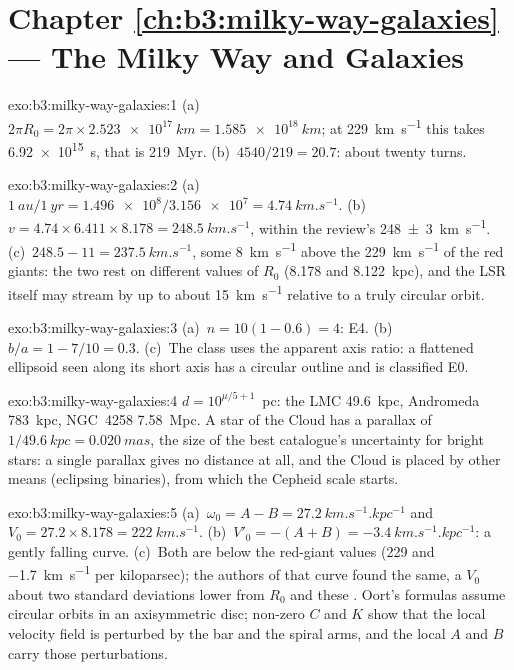 \section*{Chapter \ref{ch:b3:milky-way-galaxies} --- The Milky Way and Galaxies}

\begin{solution}{exo:b3:milky-way-galaxies:1}
(a)~$2\pi R_0 = 2\pi\times\qty{2.523e17}{km} = \qty{1.585e18}{km}$; at
\qty{229}{km.s^{-1}} this takes \qty{6.92e15}{s}, that is
\qty{219}{Myr}. (b)~$4540/219 = 20.7$: about twenty turns.
\end{solution}

\begin{solution}{exo:b3:milky-way-galaxies:2}
(a)~$\qty{1}{au}/\qty{1}{yr} = \num{1.496e8}/\num{3.156e7} =
\qty{4.74}{km.s^{-1}}$. (b)~$v = 4.74\times6.411\times8.178 =
\qty{248.5}{km.s^{-1}}$, within the review's
\qty[separate-uncertainty=true]{248 \pm 3}{km.s^{-1}}. (c)~$248.5 - 11 = \qty{237.5}{km.s^{-1}}$,
some \qty{8}{km.s^{-1}} above the \qty{229}{km.s^{-1}} of the red giants:
the two rest on different values of $R_0$ (8.178 and \qty{8.122}{kpc}),
and the LSR itself may stream by up to about \qty{15}{km.s^{-1}} relative
to a truly circular orbit.
\end{solution}

\begin{solution}{exo:b3:milky-way-galaxies:3}
(a)~$n = 10(1 - 0.6) = 4$: E4. (b)~$b/a = 1 - 7/10 = 0.3$. (c)~The class
uses the apparent axis ratio: a flattened ellipsoid seen along its short
axis has a circular outline and is classified E0.
\end{solution}

\begin{solution}{exo:b3:milky-way-galaxies:4}
$d = 10^{\mu/5 + 1}$~pc: the LMC \qty{49.6}{kpc}, Andromeda
\qty{783}{kpc}, NGC~4258 \qty{7.58}{Mpc}. A star of the Cloud has a
parallax of $1/\qty{49.6}{kpc} = \qty{0.020}{mas}$, the size of the best
catalogue's uncertainty for bright stars: a single parallax gives no
distance at all, and the Cloud is placed by other means (eclipsing
binaries), from which the Cepheid scale starts.
\end{solution}

\begin{solution}{exo:b3:milky-way-galaxies:5}
(a)~$\omega_0 = A - B = \qty{27.2}{km.s^{-1}.kpc^{-1}}$ and $V_0 =
27.2\times8.178 = \qty{222}{km.s^{-1}}$. (b)~$V'_0 = -(A + B) =
\qty{-3.4}{km.s^{-1}.kpc^{-1}}$: a gently falling curve. (c)~Both are
below the red-giant values (229 and \qty{-1.7}{km.s^{-1}} per
kiloparsec); the authors of that curve found the same, a $V_0$ about two
standard deviations lower from $R_0$ and these . Oort's
formulas assume circular orbits in an axisymmetric disc; non-zero $C$ and
$K$ show that the local velocity field is perturbed by the bar and the
spiral arms, and the local $A$ and $B$ carry those perturbations.
\end{solution}

